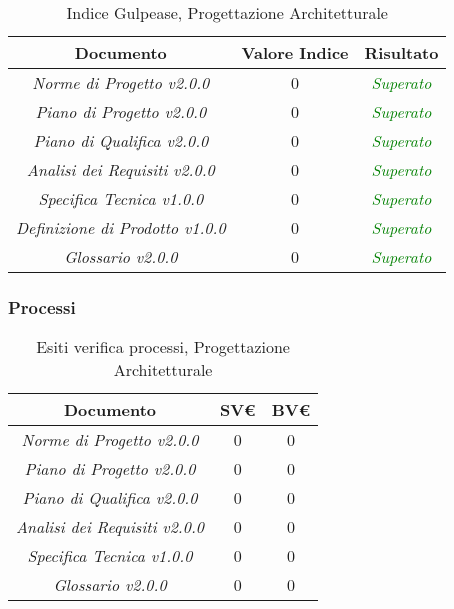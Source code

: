 \hspace{1cm}

\begin{table}[h]
	\begin{tabular}{|c|c|c|}
		\hline 
		\textbf{Documento} & \textbf{Valore Indice} & \textbf{Risultato} \\ 
		\hline
		\textit{Norme di Progetto v2.0.0} & 0 & \textcolor{green}{\textit{Superato}} \\  
		\textit{Piano di Progetto v2.0.0} & 0 & \textcolor{green}{\textit{Superato}} \\ 
		\textit{Piano di Qualifica v2.0.0} & 0 & \textcolor{green}{\textit{Superato}} \\ 
		\textit{Analisi dei Requisiti v2.0.0} & 0 & \textcolor{green}{\textit{Superato}} \\
		\textit{Specifica Tecnica v1.0.0} & 0 & \textcolor{green}{\textit{Superato}} \\ 
		\textit{Definizione di Prodotto v1.0.0} & 0 & \textcolor{green}{\textit{Superato}} \\ 
		\textit{Glossario v2.0.0} & 0 & \textcolor{green}{\textit{Superato}} \\ 
		\hline 
\end{tabular}
\caption{Indice Gulpease, Progettazione Architetturale}
\end{table}

\subsubsection{Processi}
\label{appendice 6}
\vspace{3mm}

\begin{table}[h]
	\begin{tabular}{|c|c|c|}
		\toprule
			\textbf{Documento} & \textbf{SV\euro} & \textbf{BV\euro} \\ 
		\midrule
		\midrule
			\textit{Norme di Progetto v2.0.0} & 0 & 0 \\  
			\textit{Piano di Progetto v2.0.0} & 0 & 0 \\ 
			\textit{Piano di Qualifica v2.0.0} & 0 & 0 \\ 
			\textit{Analisi dei Requisiti v2.0.0} & 0 & 0 \\
			\textit{Specifica Tecnica v1.0.0} & 0 & 0 \\ 
			\textit{Glossario v2.0.0} & 0 & 0 \\ 
		\bottomrule
	\end{tabular}
\caption{Esiti verifica processi, Progettazione Architetturale}
\end{table}

